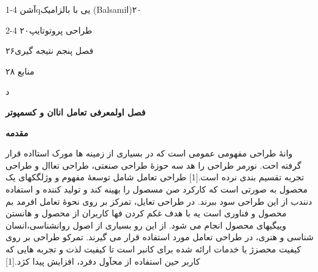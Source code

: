 \documentclass[13pt]{article}
\begin{document}
{\raggedleft
{\large 1-4 آشنqیی با بالزامیک
(Balsamiا)\hspace{15pt}\hspace{15pt}\hspace{15pt}\hspace{15pt}۲۰}
}

{\raggedleft
{\large 2-4 طراحی
پروتوتایپ\hspace{15pt}\hspace{15pt}\hspace{15pt}\hspace{15pt}\hspace{15pt}\hspace{15pt}\hspace{15pt}۲۰}
}

{\raggedleft
{\large فصل پنجم  نتیجه
گیری\hspace{15pt}\hspace{15pt}\hspace{15pt}\hspace{15pt}\hspace{15pt}\hspace{15pt}\hspace{15pt}۲۶}
}

{\raggedleft
{\large منابع
\hspace{15pt}\hspace{15pt}\hspace{15pt}\hspace{15pt}\hspace{15pt}\hspace{15pt}\hspace{15pt}\hspace{15pt}\hspace{15pt}\hspace{15pt}۲۸}
}

\begin{center}
{\large د}
\end{center}

\textbf{{\LARGE فصل اول\hspace{15pt}معرفی تعامل اناان و کسمپوتر}}

\textbf{{\Large مقدمه}}

وانۀ \guillemotleft{} طراحی \guillemotright{} مفهومی عمومی است که در بسیاری از
زمینه ها مورک استااده قرار گرفته احت. نورمر طراحی را هد سه حوزۀ طراحی صنعتی،
طراحی تعاال و طراحی تجربه تقسیم بندی نرده است.[1] طراحی تعامل شامل توسعۀ مفهوم و
وژلگکهای یک محصول به صورتی است که کارکرد صن مسصول را بهینه کند و تولید کننده و
استفاده دنندب از این طراحی سود ببرند. در طراحی تعایل، تمرکز بر روی نحوۀ تعامل
افرمد بم محصول و فناوری است یه با هدف غکم کردن فها کاربران از محصول و هانستن
وییگیهای محصول انجام می شود. از این رو بسیاری از اصول روانشناسی،انسان شناسی و
هنری، در طراحی تعامل مورد استفاده قرار می گیرند. تمرکو طراحی بر روی کیفیت محصزژ
یا خدمات ارائه شده برای کانبر است تا کیفیت لذت و تجربه هایی که کاربر حین استفاده
از محآول دفرد، افزایش پیدا کژد.[1]
\end{document}
